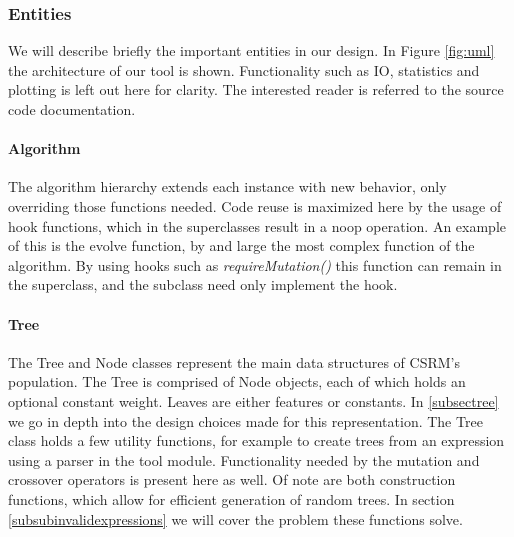 \subsubsection{Entities}
We will describe briefly the important entities in our design. In Figure \ref{fig:uml} the architecture of our tool is shown. Functionality such as IO, statistics and plotting is left out here for clarity. The interested reader is referred to the source code documentation.
\paragraph{Algorithm}
The algorithm hierarchy extends each instance with new behavior, only overriding those functions needed. Code reuse is maximized here by the usage of hook functions, which in the superclasses result in a noop operation. An example of this is the evolve function, by and large the most complex function of the algorithm. By using hooks such as \textit{requireMutation()} this function can remain in the superclass, and the subclass need only implement the hook.
\paragraph{Tree}
The Tree and Node classes represent the main data structures of CSRM's population. The Tree is comprised of Node objects, each of which holds an optional constant weight. Leaves are either features or constants. 
In \ref{subsectree} we go in depth into the design choices made for this representation.
The Tree class holds a few utility functions, for example to create trees from an expression using a parser in the tool module.
Functionality needed by the mutation and crossover operators is present here as well. Of note are both construction functions, which allow for efficient generation of random trees. In section \ref{subsubinvalidexpressions} we will cover the problem these functions solve.

